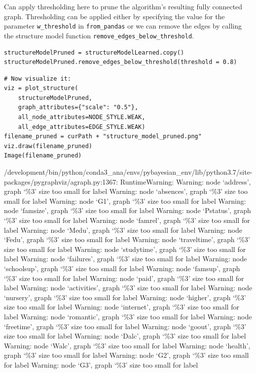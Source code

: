 \documentclass[
]{article}
\begin{document}
Can apply thresholding here to prune the algorithm's resulting fully
connected graph. Thresholding can be applied either by specifying the
value for the parameter \texttt{w_threshold} in
\texttt{from_pandas} or we can remove the edges by calling
the structure model function
\texttt{remove_edges_below_threshold}.

\begin{verbatim}
structureModelPruned = structureModelLearned.copy()
structureModelPruned.remove_edges_below_threshold(threshold = 0.8)
\end{verbatim}

\begin{verbatim}
# Now visualize it:
viz = plot_structure(
    structureModelPruned,
    graph_attributes={"scale": "0.5"},
    all_node_attributes=NODE_STYLE.WEAK,
    all_edge_attributes=EDGE_STYLE.WEAK)
filename_pruned = curPath + "structure_model_pruned.png"
viz.draw(filename_pruned)
Image(filename_pruned)
\end{verbatim}

/development/bin/python/conda3\_ana/envs/pybayesian\_env/lib/python3.7/site-packages/pygraphviz/agraph.py:1367:
RuntimeWarning: Warning: node `address', graph `\%3' size too small for
label Warning: node `absences', graph `\%3' size too small for label
Warning: node `G1', graph `\%3' size too small for label Warning: node
`famsize', graph `\%3' size too small for label Warning: node `Pstatus',
graph `\%3' size too small for label Warning: node `famrel', graph `\%3'
size too small for label Warning: node `Medu', graph `\%3' size too
small for label Warning: node `Fedu', graph `\%3' size too small for
label Warning: node `traveltime', graph `\%3' size too small for label
Warning: node `studytime', graph `\%3' size too small for label Warning:
node `failures', graph `\%3' size too small for label Warning: node
`schoolsup', graph `\%3' size too small for label Warning: node
`famsup', graph `\%3' size too small for label Warning: node `paid',
graph `\%3' size too small for label Warning: node `activities', graph
`\%3' size too small for label Warning: node `nursery', graph `\%3' size
too small for label Warning: node `higher', graph `\%3' size too small
for label Warning: node `internet', graph `\%3' size too small for label
Warning: node `romantic', graph `\%3' size too small for label Warning:
node `freetime', graph `\%3' size too small for label Warning: node
`goout', graph `\%3' size too small for label Warning: node `Dalc',
graph `\%3' size too small for label Warning: node `Walc', graph `\%3'
size too small for label Warning: node `health', graph `\%3' size too
small for label Warning: node `G2', graph `\%3' size too small for label
Warning: node `G3', graph `\%3' size too small for label
\end{document}
